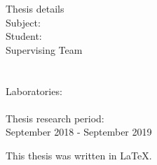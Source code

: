 \pagestyle{empty}
\hspace{10pt}
\begin{center}
\Large{Thesis details}\\[1cm]
{\large Subject:}
\textbf{\large \doctitle}\\[1cm]
\large {Student: \textbf{\nomme}\\[1cm]
\large{Supervising Team}\\
\textbf{\suptitle \, \supname}\\[1cm]
\textbf{\cosuptitle \, \cosupname} \\[1cm]
Laboratories:\\
\lab \\[1cm]
Thesis research period:\\ September 2018 - September 2019\\[1cm]}
\end{center}

\vspace{5em}

\begin{center}
  { \large
    This thesis was written in \LaTeX.\\
  }
\end{center}

